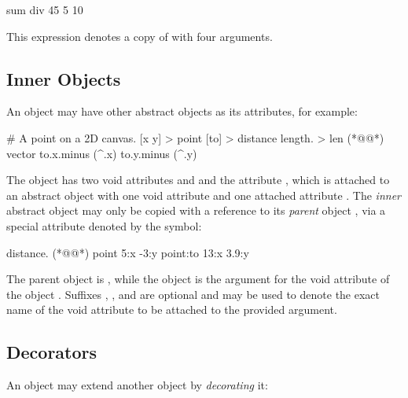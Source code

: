 \begin{ffcode}
sum div 45 5 10
\end{ffcode}

This expression denotes a copy of  with four arguments.

\subsection{Inner Objects}

An object may have other abstract objects as its attributes, for example:

\begin{ffcode}
# A point on a 2D canvas.
[x y] > point
  [to] > distance
    length. > len (*@\label{ln:vector-length}@*)
      vector
        to.x.minus (^.x)
        to.y.minus (^.y)
\end{ffcode}

The object  has two void attributes  and 
and the attribute , which is attached to an abstract
object with one void attribute  and one attached attribute .
The \emph{inner} abstract object  may only be copied
with a reference to its \emph{parent} object , via
a special attribute denoted by the \ff{\^{}} symbol:

\begin{ffcode}
distance. (*@\label{ln:point-copy}@*)
  point
    5:x
    -3:y
  point:to
    13:x
    3.9:y
\end{ffcode}

The parent object is , while the object 
is the argument for the void attribute  of the object .
Suffixes , , and  are optional and may be used
to denote the exact name of the void attribute to be attached to the
provided argument.

\subsection{Decorators}

An object may extend another object by \emph{decorating} it:


